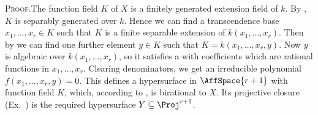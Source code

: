 {\smallskip
\noindent\textsc{Proof.}\enspace The function field $K$ of $X$ is a finitely generated extension field of $k$. By , $K$ is separably generated over $k$. Hence we can find a transcendence base $x_1,\ldots,x_r\in K$ such that $K$ is a finite separable extension of $k(x_1,\ldots,x_r)$. Then by  we can find one further element $y\in K$ such that $K=k(x_1,\ldots,x_r,y)$. Now $y$ is algebraic over $k(x_1,\ldots,x_r)$, so it satisfies a \hypertarget{err-I-4.9}{} with coefficients which are rational functions in $x_1,\ldots,x_r$. Clearing denominators\EditionText{}, we get an irreducible polynomial $f(x_1,\ldots,x_r,y)=0$. This defines a hypersurface in $\AffSpace{r+1}$ with function field $K$, which, according to , is birational to $X$. Its projective closure (Ex.~) is the required hypersurface $Y\subseteq\Proj^{r+1}$.%
}
